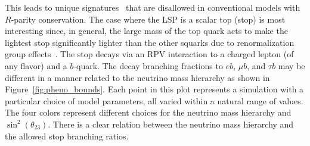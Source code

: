 This leads to unique signatures~\cite{FileviezPerez:2012mj, Perez:2013kla,
Ovrut:2012wg, Ovrut:2014rba, Ovrut:2015uea} that are disallowed in conventional
models with $R$-parity conservation.
The case where the LSP is a scalar top (stop) is most interesting
since, in general, the large mass of the top quark acts to make the
lightest stop significantly lighter than the other squarks due to
renormalization group effects~\cite{Barbieri:1987fn,deCarlos:1993yy}.
The stop decays via an RPV interaction to a charged lepton (of any
flavor) and a $b$-quark.
The decay branching fractions to $e b$, $\mu b$, and $\tau b$ may be different
in a manner related to the neutrino mass
hierarchy as shown in
Figure~\ref{fig:pheno_bounds}.
Each point in this plot represents a simulation with a particular choice of
model parameters, all varied within a natural range of values.
The four colors represent different choices for the neutrino mass hierarchy and 
$\sin^2(\theta_{23})$.
There is a clear relation between the neutrino mass hierarchy and the allowed
stop branching ratios.\cite{Marshall:2014kea, Marshall:2014cwa}

\begin{figure}[ht]
\end{figure}

